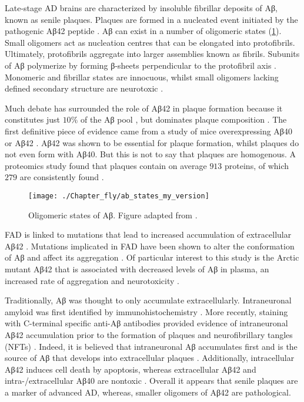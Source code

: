 Late-stage AD brains are characterized by insoluble fibrillar deposits of Aβ,
known as senile plaques.
Plaques are formed in a nucleated event initiated by the pathogenic
Aβ42 peptide \cite{Jarrett1993}.
Aβ can exist in a number of oligomeric states (\ref{fig:ab_states}).
Small oligomers act as nucleation centres that can be elongated into protofibrils.
Ultimately, protofibrils aggregate into larger assemblies known as fibrils.
Subunits of Aβ polymerize by forming β-sheets perpendicular to the protofibril
axis \cite{Serpell2000}.
Monomeric and fibrillar states are innocuous, whilst small oligomers lacking defined
secondary structure are neurotoxic \cite{Ahmed2010}.

Much debate has surrounded the role of Aβ42 in plaque formation because it constitutes just
$10\%$ of the Aβ pool \cite{LaFerla2007}, but dominates plaque composition \cite{Miller1993}.
The first definitive piece of evidence came from a study of mice overexpressing Aβ40 or Aβ42
\cite{McGowan2005}.
Aβ42 was shown to be essential for plaque formation,
whilst plaques do not even form with Aβ40.
But this is not to say that plaques are homogenous.
A proteomics study found that plaques contain on average $913$ proteins,
of which $279$ are consistently found \cite{Drummond2017}.

\begin{figure}[!hbt]
    \centering
    \texttt{[image: ./Chapter\_fly/ab\_states\_my\_version]}
    \caption{%
        Oligomeric states of Aβ.
        Figure adapted from \cite{LaFerla2007}.
    }
    \label{fig:ab_states}
\end{figure}

FAD is linked to mutations that lead to increased accumulation of extracellular
Aβ42 \cite{Younkin1998}.
Mutations implicated in FAD have been shown to alter the conformation of Aβ
and affect its aggregation \cite{Hatami2017}.
Of particular interest to this study is the Arctic mutant Aβ42 that is associated with
decreased levels of Aβ in plasma, an increased rate of aggregation
and neurotoxicity \cite{Nilsberth2001,Murakami2002}.

Traditionally, Aβ was thought to only accumulate extracellularly.
Intraneuronal amyloid was first identified by immunohistochemistry \cite{Masters1985}.
More recently, staining with C-terminal specific anti-Aβ antibodies provided evidence
of intraneuronal Aβ42 accumulation prior to the formation of plaques
and neurofibrillary tangles (NFTs) \cite{Gouras2000}.
Indeed, it is believed that intraneuronal Aβ accumulates first and is the source of Aβ
that develops into extracellular plaques \cite{Gouras2000}.
Additionally, intracellular Aβ42 induces cell death by apoptosis,
whereas extracellular Aβ42 and intra-/extracellular Aβ40 are nontoxic \cite{Zhang2002}.
Overall it appears that senile plaques are a marker of advanced AD, whereas,
smaller oligomers of Aβ42 are pathological.

